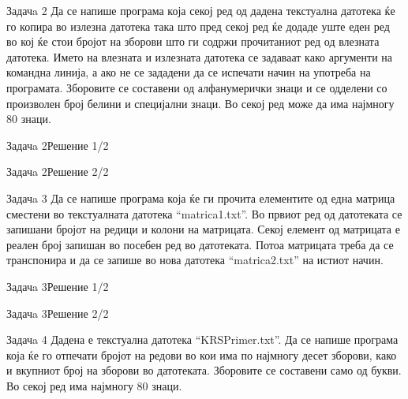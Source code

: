 \begin{frame}{Задачa 2}
Да се напише програма која секој ред од дадена текстуална датотека ќе го копира
во излезна датотека така што пред секој ред ќе додаде уште еден ред во кој ќе
стои бројот на зборови што ги содржи прочитаниот ред од влезната датотека. Името
на влезната и излезната датотека се задаваат како аргументи на командна линија,
а ако не се зададени да се испечати начин на употреба на програмата. Зборовите
се составени од алфанумерички знаци и се одделени со произволен број белини и
специјални знаци. Во секој ред може да има најмногу 80 знаци.
\end{frame}

\begin{frame}[fragile]{Задачa 2}{Решение 1/2} 

\end{frame}



\begin{frame}[fragile]{Задачa 2}{Решение 2/2} 

\end{frame}

\begin{frame}{Задачa 3}
Да се напише програма која ќе ги прочита елементите од една матрица сместени во
текстуалната датотека ``matrica1.txt''. Во првиот ред од датотеката се запишани
бројот на редици и колони на матрицата. Секој елемент од матрицата е реален број
запишан во посебен ред во датотеката. Потоа матрицата треба да се транспонира и
да се запише во нова датотека ``matrica2.txt'' на истиот начин.
\end{frame}

\begin{frame}[fragile]{Задачa 3}{Решение 1/2} 

\end{frame}



\begin{frame}[fragile]{Задачa 3}{Решение 2/2} 

\end{frame}


\begin{frame}{Задачa 4}
Дадена е текстуална датотека ``KRSPrimer.txt''. Да се напише програма која ќе го
отпечати бројот на редови во кои има по најмногу десет зборови, како и вкупниот
број на зборови во датотеката. Зборовите се составени само од букви. Во секој
ред има најмногу 80 знаци.
\end{frame}

